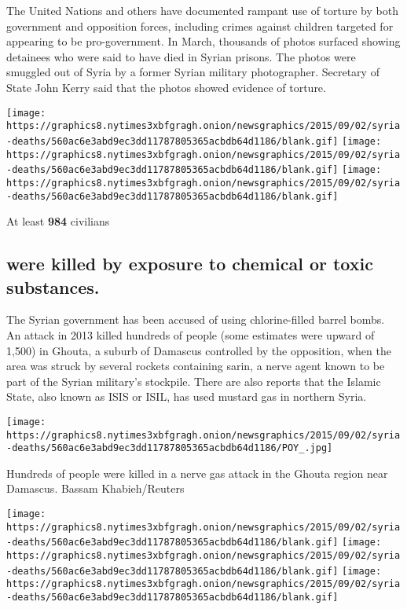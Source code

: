 The United Nations and others have documented rampant use of torture by
both government and opposition forces, including crimes against children
targeted for appearing to be pro-government. In March, thousands of
photos surfaced showing detainees who were said to have died in Syrian
prisons. The photos were smuggled out of Syria by a former Syrian
military photographer. Secretary of State John Kerry said that the
photos showed evidence of torture.

\texttt{[image: https://graphics8.nytimes3xbfgragh.onion/newsgraphics/2015/09/02/syria-deaths/560ac6e3abd9ec3dd11787805365acbdb64d1186/blank.gif]}
\texttt{[image: https://graphics8.nytimes3xbfgragh.onion/newsgraphics/2015/09/02/syria-deaths/560ac6e3abd9ec3dd11787805365acbdb64d1186/blank.gif]}
\texttt{[image: https://graphics8.nytimes3xbfgragh.onion/newsgraphics/2015/09/02/syria-deaths/560ac6e3abd9ec3dd11787805365acbdb64d1186/blank.gif]}

At least \textbf{984} civilians

\hypertarget{were-killed-by-exposure-to-chemical-or-toxic-substances}{%
\subsection{were killed by exposure to chemical or toxic
substances.}\label{were-killed-by-exposure-to-chemical-or-toxic-substances}}

The Syrian government has been accused of using chlorine-filled barrel
bombs. An attack in 2013 killed hundreds of people (some estimates were
upward of 1,500) in Ghouta, a suburb of Damascus controlled by the
opposition, when the area was struck by several rockets containing
sarin, a nerve agent known to be part of the Syrian military's
stockpile. There are also reports that the Islamic State, also known as
ISIS or ISIL, has used mustard gas in northern Syria.

\texttt{[image: https://graphics8.nytimes3xbfgragh.onion/newsgraphics/2015/09/02/syria-deaths/560ac6e3abd9ec3dd11787805365acbdb64d1186/POY\_.jpg]}

Hundreds of people were killed in a nerve gas attack in the Ghouta
region near Damascus. Bassam Khabieh/Reuters

\texttt{[image: https://graphics8.nytimes3xbfgragh.onion/newsgraphics/2015/09/02/syria-deaths/560ac6e3abd9ec3dd11787805365acbdb64d1186/blank.gif]}
\texttt{[image: https://graphics8.nytimes3xbfgragh.onion/newsgraphics/2015/09/02/syria-deaths/560ac6e3abd9ec3dd11787805365acbdb64d1186/blank.gif]}
\texttt{[image: https://graphics8.nytimes3xbfgragh.onion/newsgraphics/2015/09/02/syria-deaths/560ac6e3abd9ec3dd11787805365acbdb64d1186/blank.gif]}

